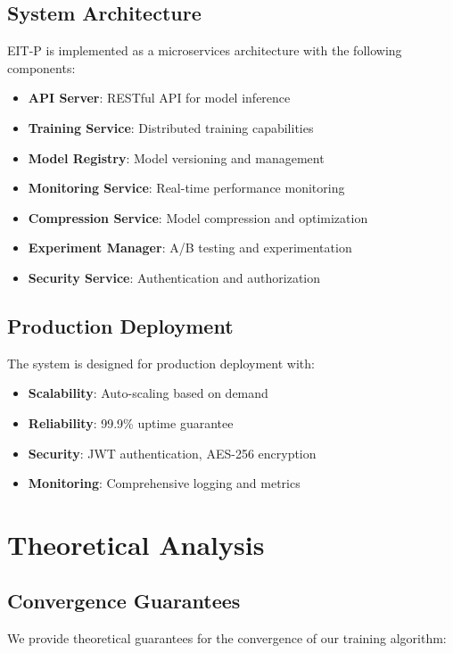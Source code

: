 \documentclass[12pt]{article}
\begin{document}
\subsection{System Architecture}

EIT-P is implemented as a microservices architecture with the following components:

\begin{itemize}
\item \textbf{API Server}: RESTful API for model inference
\item \textbf{Training Service}: Distributed training capabilities
\item \textbf{Model Registry}: Model versioning and management
\item \textbf{Monitoring Service}: Real-time performance monitoring
\item \textbf{Compression Service}: Model compression and optimization
\item \textbf{Experiment Manager}: A/B testing and experimentation
\item \textbf{Security Service}: Authentication and authorization
\end{itemize}

\subsection{Production Deployment}

The system is designed for production deployment with:

\begin{itemize}
\item \textbf{Scalability}: Auto-scaling based on demand
\item \textbf{Reliability}: 99.9\% uptime guarantee
\item \textbf{Security}: JWT authentication, AES-256 encryption
\item \textbf{Monitoring}: Comprehensive logging and metrics
\end{itemize}

\section{Theoretical Analysis}

\subsection{Convergence Guarantees}

We provide theoretical guarantees for the convergence of our training algorithm:
\end{document}
